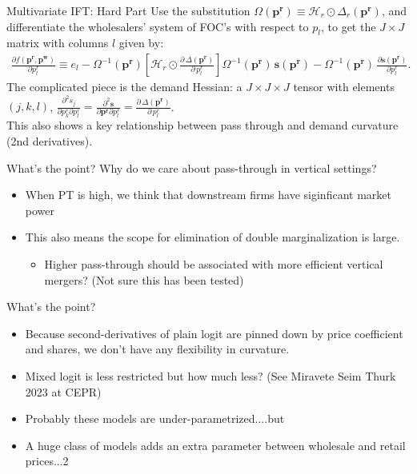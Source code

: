 \begin{frame}{Multivariate IFT: Hard Part}
Use the substitution $\Omega(\symbf{p^r}) \equiv \mathcal{H}_r \odot \Delta_{r}(\symbf{p^r})$, and differentiate the wholesalers' system of FOC's with respect to $p_l$, to get the $J \times J$ matrix with columns $l$ given by:
\begin{align}
\frac{\partial f(\symbf{p^r},\symbf{p^w})}{\partial p_l^r} \equiv e_l - \Omega^{-1}(\symbf{p^r})
\left[  \mathcal{H}_{r} \odot \frac{\partial\, \Delta(\symbf{p^r})}{\partial\, p_l^r} \right]
\Omega^{-1}(\symbf{p^r})\,
\symbf{s}(\symbf{p^r}) -\Omega^{-1}(\symbf{p^r})\, \frac{\partial \symbf{s}(\symbf{p^r})}{\partial p_l^r}.
\end{align}
The complicated piece is the demand Hessian: a $J \times J \times J$ tensor with elements $(j,k,l)$, $\frac{\partial^2 s_j}{\partial p_k^r \partial p_l^r} = \frac{\partial^2 \symbf{s}}{\partial \symbf{p^r} \partial p_l^r}=\frac{\partial\, \Delta(\symbf{p^r})}{\partial\, p_l^r}$.\\

This also shows a key relationship between \alert{pass through} and \alert{demand curvature} (2nd derivatives).
\end{frame}



\begin{frame}{What's the point?}
Why do we care about pass-through in vertical settings?
\begin{itemize}
\item When PT is high, we think that downstream firms have siginficant market power
\item This also means the scope for \alert{elimination of double marginalization} is large.
\begin{itemize}
\item Higher pass-through should be associated with more efficient vertical mergers? (Not sure this has been tested)
\end{itemize}
\end{itemize}
\end{frame}




\begin{frame}{What's the point?}

\begin{itemize}
\item Because second-derivatives of plain logit are pinned down by price coefficient and shares, we don't have any flexibility in curvature.
\item Mixed logit is less restricted but how much less? (See Miravete Seim Thurk 2023 at CEPR)
\item Probably these models are under-parametrized....but
\item A huge class of models adds an extra parameter between wholesale and retail prices...2
\end{itemize}
\end{frame}



